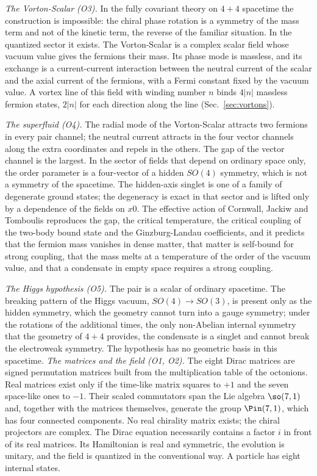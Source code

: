\emph{The Vorton-Scalar (O3).} In the fully covariant theory on $4+4$ spacetime the construction is
impossible: the chiral phase rotation is a symmetry of the mass term and not of the kinetic term, the
reverse of the familiar situation. In the quantized sector it exists. The Vorton-Scalar is a complex
scalar field whose vacuum value gives the fermions their mass. Its phase mode is massless, and its
exchange is a current-current interaction between the neutral current of the scalar and the axial
current of the fermions, with a Fermi constant fixed by the vacuum value. A vortex line of this field
with winding number $n$ binds $4|n|$ massless fermion states, $2|n|$ for each direction along the
line (Sec.~\ref{sec:vortons}).

\emph{The superfluid (O4).} The radial mode of the Vorton-Scalar attracts two fermions in every pair
channel; the neutral current attracts in the four vector channels along the extra coordinates and
repels in the others. The gap of the vector channel is the largest. In the sector of fields that
depend on ordinary space only, the order parameter is a four-vector of a hidden $SO(4)$ symmetry, which
is not a symmetry of the spacetime. The hidden-axis singlet is one of a family of degenerate ground
states; the degeneracy is exact in that sector and is lifted only by a dependence of the fields on
$x0$. The effective action of Cornwall, Jackiw and Tomboulis reproduces the gap, the critical
temperature, the critical coupling of the two-body bound state and the Ginzburg-Landau coefficients,
and it predicts that the fermion mass vanishes in dense matter, that matter is self-bound for strong
coupling, that the mass melts at a temperature of the order of the vacuum value, and that a condensate
in empty space requires a strong coupling.

\emph{The Higgs hypothesis (O5).} The pair is a scalar of ordinary spacetime. The breaking pattern of
the Higgs vacuum, $SO(4)\to SO(3)$, is present only as the hidden symmetry, which the geometry cannot
turn into a gauge symmetry; under the rotations of the additional times, the only non-Abelian internal
symmetry that the geometry of $4+4$ provides, the condensate is a singlet and cannot break the
electroweak symmetry. The hypothesis has no geometric basis in this spacetime.
\emph{The matrices and the field (O1, O2).} The eight Dirac matrices are signed permutation matrices
built from the multiplication table of the octonions. Real matrices exist only if the time-like matrix
squares to $+1$ and the seven space-like ones to $-1$. Their scaled commutators span the Lie algebra
$\so(7,1)$ and, together with the matrices themselves, generate the group $\Pin(7,1)$, which has four
connected components. No real chirality matrix exists; the chiral projectors are complex. The Dirac
equation necessarily contains a factor $i$ in front of its real matrices. Its Hamiltonian is real and
symmetric, the evolution is unitary, and the field is quantized in the conventional way. A particle
has eight internal states.

